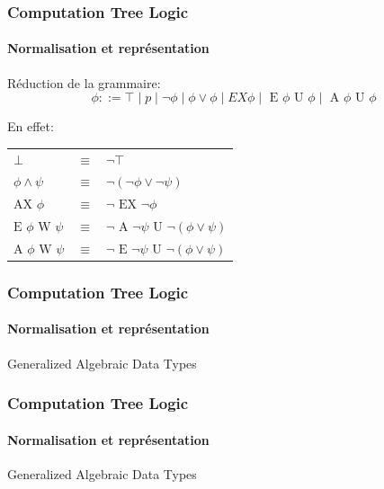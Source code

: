 \documentclass[11pt]{beamer}
\begin{document}
\begin{frame}
    \frametitle{Computation Tree Logic}
    \framesubtitle{Normalisation et représentation}

    Réduction de la grammaire:
        $$\phi ::= \top \mid p \mid \neg \phi \mid \phi \lor \phi \mid EX \phi \mid\mbox{ E }\phi\mbox{ U }\phi \mid\mbox{ A }\phi\mbox{ U }\phi$$

    \pause
    En effet:
    \begin{tabular}{lcl}
        $\bot$ &$\equiv$& $\neg \top$\\
        $\phi \land \psi$ &$\equiv$& $\neg (\neg \phi \lor \neg \psi)$\\
        $\mbox{AX }\phi$ &$\equiv$& $\neg\mbox{ EX }\neg \phi$\\
        $\mbox{E }\phi\mbox{ W }\psi$ &$\equiv$& $\neg\mbox{ A }\neg \psi\mbox{ U }\neg(\phi \lor \psi)$\\
        $\mbox{A }\phi\mbox{ W }\psi$ &$\equiv$& $\neg\mbox{ E }\neg \psi\mbox{ U }\neg(\phi \lor \psi)$\\
    \end{tabular}
\end{frame}

\setlength{\columnsep}{-30pt}
\begin{frame}
    \frametitle{Computation Tree Logic}
    \framesubtitle{Normalisation et représentation}

    Generalized Algebraic Data Types\\\bigskip

    \scriptsize
    \begin{multicols}{2}
    
    \bigskip
    \phantom{.}
    \end{multicols}

\end{frame}

\begin{frame}
    \frametitle{Computation Tree Logic}
    \framesubtitle{Normalisation et représentation}

    Generalized Algebraic Data Types\\\bigskip

    \scriptsize
    

\end{frame}
\end{document}
